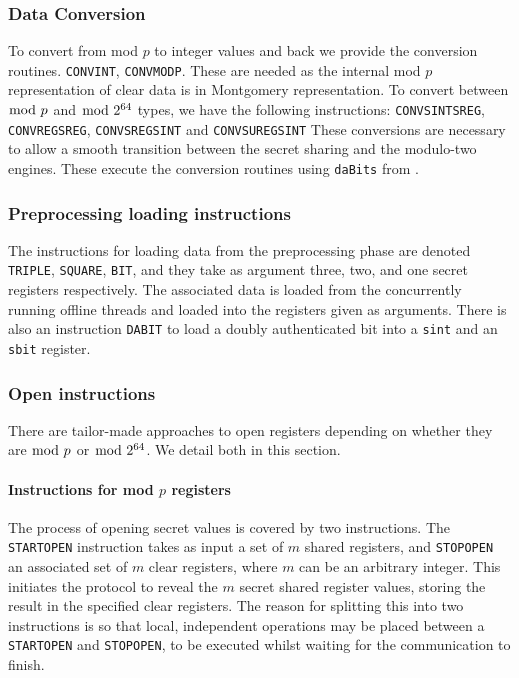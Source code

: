 \subsubsection{Data Conversion}
To convert from mod $p$ to integer values and
back we provide the conversion routines.
\verb+CONVINT+, \verb+CONVMODP+.
These are needed as the internal mod $p$ representation
of clear data is in Montgomery representation.
To convert between $\bmod \; p$ and $\bmod \; 2^{64}$ types, we have the following instructions:
\verb+CONVSINTSREG+, \verb+CONVREGSREG+, \verb+CONVSREGSINT+ and \verb+CONVSUREGSINT+
These conversions are necessary to allow a smooth transition between the secret sharing 
and the modulo-two engines.
These execute the conversion routines using \verb+daBits+ from \cite{daBitPaper}.

\subsubsection{Preprocessing loading instructions}
The instructions for loading data from the preprocessing phase
are denoted \verb+TRIPLE+, \verb+SQUARE+, \verb+BIT+,
and they take as argument three, two, and one secret registers
respectively.
The associated data is loaded from the concurrently running
offline threads and loaded into the registers given as arguments.
There is also an instruction \verb+DABIT+ to load a doubly authenticated
bit into a \verb|sint| and an \verb|sbit| register.

\subsubsection{Open instructions}
There are tailor-made approaches to open registers depending on whether they are $\bmod \; p$ or $\bmod \; 2^{64}$. We detail both in this section.

\paragraph{Instructions for mod $p$ registers}
The process of opening secret values is covered by two instructions.
The \verb+STARTOPEN+ instruction takes as input a set of $m$
shared registers, and \verb+STOPOPEN+ an associated set of $m$
clear registers, where $m$ can be an arbitrary integer.
This initiates the protocol to reveal the $m$ secret shared register values,
storing the result in the specified clear registers. The reason for
splitting this into two instructions is so that local, independent
operations may be placed between a \verb+STARTOPEN+ and \verb+STOPOPEN+,
to be executed whilst waiting for the communication to finish.

